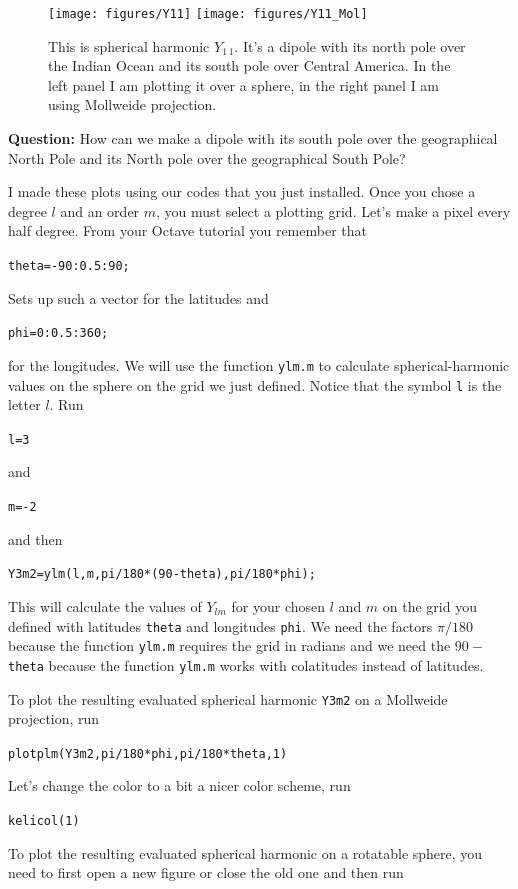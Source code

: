 \documentclass[11pt]{article}
\newcommand{\Yfun}{Y}
\begin{document}
\begin{figure}[ht!]
  \centering \texttt{[image: figures/Y11]} \texttt{[image: figures/Y11\_Mol]}
  \caption{This is spherical harmonic $\Yfun_{1\,1}$. It's a dipole with
    its north pole over the Indian Ocean and its south pole over Central
    America. In the left panel I am plotting it over a sphere, in the
    right panel I am using Mollweide projection.}
  \label{Y11fig}
\end{figure}

\textbf{Question:} How can we make a dipole with its south pole over
the geographical North Pole and its North pole over the geographical
South Pole?


I made these plots using our codes that you just installed. Once you
chose a degree $l$ and an order $m$, you must select a plotting
grid. Let's make a pixel every half degree. From your Octave tutorial
you remember that

\qquad \verb+theta=-90:0.5:90;+

Sets up such a vector for the latitudes and 

\qquad \verb+phi=0:0.5:360;+

for the longitudes. We will use the function \verb+ylm.m+ to
calculate spherical-harmonic values on the sphere on the grid we just
defined. Notice that the symbol \verb+l+ is the letter $l$. Run

\qquad \verb+l=3+ 

and 

\qquad \verb+m=-2+

and then 

\qquad \verb+Y3m2=ylm(l,m,pi/180*(90-theta),pi/180*phi);+

This will calculate the values of $\Yfun_{lm}$ for your chosen $l$ and
$m$ on the grid you defined with latitudes \verb+theta+ and longitudes
\verb+phi+. We need the factors $\pi/180$ because the function
\verb+ylm.m+ requires the grid in radians and we need the $90-$
\verb+theta+ because the function \verb+ylm.m+ works with colatitudes
instead of latitudes.

To plot the resulting evaluated spherical harmonic \verb+Y3m2+ on a
Mollweide projection, run
  
\qquad \verb+plotplm(Y3m2,pi/180*phi,pi/180*theta,1)+

Let's change the color to a bit a nicer color scheme, run

\quad \verb+kelicol(1)+


To plot the resulting evaluated spherical harmonic on a rotatable
sphere, you need to first open a new figure or close the old one and
then run
\end{document}
